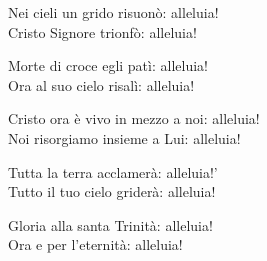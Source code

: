 
\strofa Nei cieli un grido risuonò: alleluia!\\
Cristo Signore trionfò: alleluia!

\spazio


\spazio

\strofa Morte di croce egli patì: alleluia!\\
Ora al suo cielo risalì: alleluia!

\spazio


\spazio

\strofa Cristo ora è vivo in mezzo a noi: alleluia!\\
Noi risorgiamo insieme a Lui: alleluia!

\spazio


\spazio

\strofa Tutta la terra acclamerà: alleluia!'\\
Tutto il tuo cielo griderà: alleluia!

\spazio


\spazio

\strofa Gloria alla santa Trinità: alleluia!\\
Ora e per l'eternità: alleluia!

\spazio

